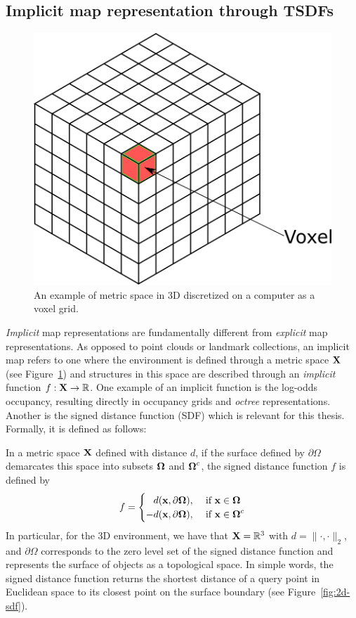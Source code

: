 \subsection{Implicit map representation through TSDFs}

\begin{figure}[htpb]
    \centering
    \includegraphics[width=0.5\linewidth]{figs/metric-space-grid.png}
    \caption{An example of metric space in 3D discretized on a computer as a voxel grid.}%
    \label{fig:voxel-grid}
\end{figure}

\emph{Implicit} map representations are fundamentally different from \emph{explicit} map representations. As opposed to point clouds or landmark collections, an implicit map refers to one where the environment is defined through a metric space $\mathbf{X}$ (see Figure~\ref{fig:voxel-grid}) and structures in this space are described through an \emph{implicit} function $f : \mathbf{X} \rightarrow \mathbb{R}$. One example of an implicit function is the log-odds occupancy, resulting directly in occupancy grids \cite{thrunProbabilisticRoboticsIntelligent2005} and \emph{octree} \cite{hornungOctoMapEfficientProbabilistic2013} representations. Another is the signed distance function (SDF) which is relevant for this thesis. Formally, it is defined as follows:

In a metric space $\mathbf{X}$ defined with distance $d$, if the surface defined by $\partial \Omega$ demarcates this space into subsets  $\boldsymbol \Omega$ and  $\boldsymbol \Omega^c$, the signed distance function $f$ is defined by
\begin{align}
   f = \begin{cases}
       \phantom{-}d(\mathbf{x}, \partial \boldsymbol \Omega), &\text{ if } \mathbf{x} \in \boldsymbol \Omega\\
       -d(\mathbf{x}, \partial \boldsymbol \Omega), &\text{ if } \mathbf{x} \in \boldsymbol \Omega^c
   \end{cases}
\end{align}
In particular, for the 3D environment, we have that $\mathbf{X} = \mathbb{R}^3$ with $d = \|\cdot, \cdot \|_2$, and $\partial \Omega$ corresponds to the zero level set of the signed distance function and represents the surface of objects as a topological space. In simple words, the signed distance function returns the shortest distance of a query point in Euclidean space to its closest point on the surface boundary (see Figure~\ref{fig:2d-sdf}).


